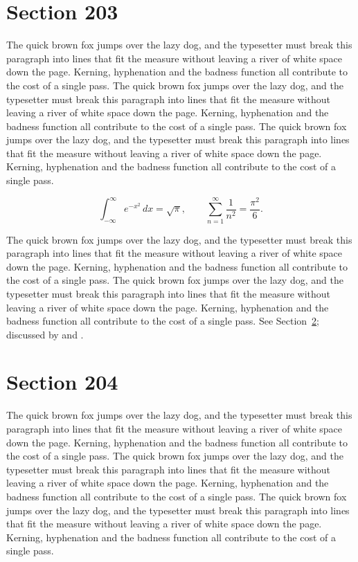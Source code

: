 \documentclass{article}
\begin{document}
\section{Section 203}
\label{sec:203}
The quick brown fox jumps over the lazy dog, and the typesetter must break this paragraph into lines that fit the measure without leaving a river of white space down the page. Kerning, hyphenation and the badness function all contribute to the cost of a single pass. The quick brown fox jumps over the lazy dog, and the typesetter must break this paragraph into lines that fit the measure without leaving a river of white space down the page. Kerning, hyphenation and the badness function all contribute to the cost of a single pass. The quick brown fox jumps over the lazy dog, and the typesetter must break this paragraph into lines that fit the measure without leaving a river of white space down the page. Kerning, hyphenation and the badness function all contribute to the cost of a single pass. 

\begin{equation}\label{eq:203}
\int_{-\infty}^{\infty} e^{-x^{2}}\,dx = \sqrt{\pi}, \qquad
\sum_{n=1}^{\infty} \frac{1}{n^{2}} = \frac{\pi^{2}}{6}.
\end{equation}

The quick brown fox jumps over the lazy dog, and the typesetter must break this paragraph into lines that fit the measure without leaving a river of white space down the page. Kerning, hyphenation and the badness function all contribute to the cost of a single pass. The quick brown fox jumps over the lazy dog, and the typesetter must break this paragraph into lines that fit the measure without leaving a river of white space down the page. Kerning, hyphenation and the badness function all contribute to the cost of a single pass. 
See Section~\ref{sec:204}; discussed by \textcite{k4} and \textcite{l1}.
\section{Section 204}
\label{sec:204}
The quick brown fox jumps over the lazy dog, and the typesetter must break this paragraph into lines that fit the measure without leaving a river of white space down the page. Kerning, hyphenation and the badness function all contribute to the cost of a single pass. The quick brown fox jumps over the lazy dog, and the typesetter must break this paragraph into lines that fit the measure without leaving a river of white space down the page. Kerning, hyphenation and the badness function all contribute to the cost of a single pass. The quick brown fox jumps over the lazy dog, and the typesetter must break this paragraph into lines that fit the measure without leaving a river of white space down the page. Kerning, hyphenation and the badness function all contribute to the cost of a single pass. 
\end{document}
